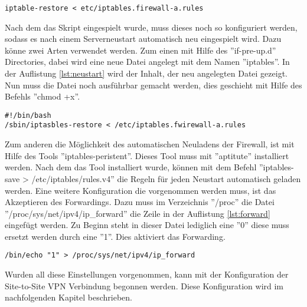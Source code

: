 \lstset{
	basicstyle=\footnotesize, frame=tb,
	xleftmargin=.2\textwidth, xrightmargin=.2\textwidth
}
\begin{lstlisting}[caption={Einspielen des Firewallskriptes der Firma a},label=lst:fwrestorea]
iptable-restore < etc/iptables.firewall-a.rules
\end{lstlisting}
\vspace{\baselineskip}
Nach dem das Skript eingespielt wurde, muss dieses noch so konfiguriert werden, sodass es nach einem Serverneustart automatisch neu eingespielt wird. Dazu könne zwei Arten verwendet werden. Zum einen mit Hilfe des ''if-pre-up.d'' Directories, dabei wird eine neue Datei angelegt mit dem Namen ''iptables''. In der Auflistung \ref{lst:neustart} wird der Inhalt, der neu angelegten Datei gezeigt. Nun muss die Datei noch ausführbar gemacht werden, dies geschieht mit Hilfe des Befehls ''chmod +x''.
\newline
\lstset{
	basicstyle=\footnotesize, frame=tb,
	xleftmargin=.2\textwidth, xrightmargin=.2\textwidth
}
\begin{lstlisting}[caption={Automatisches Laden des Iptablesskriptes bei Serverneustart},label=lst:neustart]
#!/bin/bash
/sbin/iptasbles-restore < /etc/iptables.fwirewall-a.rules
\end{lstlisting}
\vspace{\baselineskip}
Zum anderen die Möglichkeit des automatischen Neuladens der Firewall, ist mit Hilfe des Tools ''iptables-peristent''. Dieses Tool muss mit ''aptitute'' installiert werden. Nach dem das Tool installiert wurde, können mit dem Befehl ''iptables-save > /etc/iptables/rules.v4'' die Regeln für jeden Neustart automatisch geladen werden. 
\newline 
Eine weitere Konfiguration die vorgenommen werden muss, ist das Akzeptieren des Forwardings. Dazu muss im Verzeichnis ''/proc'' die Datei ''/proc/sys/net/ipv4/ip\_forward'' die Zeile in der Auflistung \ref{lst:forward} eingefügt werden. Zu Beginn steht in dieser Datei lediglich eine ''0'' diese muss ersetzt werden durch eine ''1''. Dies aktiviert das Forwarding.\newline
\lstset{
	basicstyle=\footnotesize, frame=tb,
	xleftmargin=.2\textwidth, xrightmargin=.2\textwidth
}
\begin{lstlisting}[caption={Forwarding aktivieren},label=lst:forward]
/bin/echo "1" > /proc/sys/net/ipv4/ip_forward
\end{lstlisting}
\vspace{\baselineskip}
Wurden all diese Einstellungen vorgenommen, kann  mit der Konfiguration der Site-to-Site VPN Verbindung begonnen werden. Diese Konfiguration wird im nachfolgenden Kapitel beschrieben.



